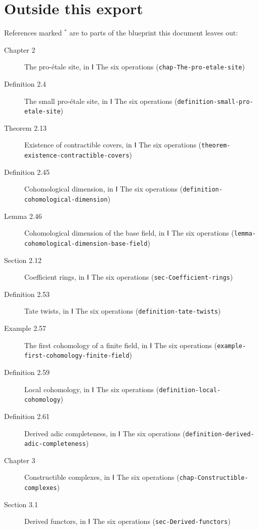 \documentclass[11pt]{article}
\newcommand{\bpslug}[1]{\texttt{#1}}
\begin{document}
\section*{Outside this export}
References marked \ensuremath{{}^\ast} are to parts of the blueprint this document leaves out:
\begin{description}
\item[Chapter 2] The pro-étale site, in Ⅰ The six operations (\bpslug{chap-{}\allowbreak{}The-{}\allowbreak{}pro-{}\allowbreak{}etale-{}\allowbreak{}site})
\item[Definition 2.4] The small pro-étale site, in Ⅰ The six operations (\bpslug{definition-{}\allowbreak{}small-{}\allowbreak{}pro-{}\allowbreak{}etale-{}\allowbreak{}site})
\item[Theorem 2.13] Existence of contractible covers, in Ⅰ The six operations (\bpslug{theorem-{}\allowbreak{}existence-{}\allowbreak{}contractible-{}\allowbreak{}covers})
\item[Definition 2.45] Cohomological dimension, in Ⅰ The six operations (\bpslug{definition-{}\allowbreak{}cohomological-{}\allowbreak{}dimension})
\item[Lemma 2.46] Cohomological dimension of the base field, in Ⅰ The six operations (\bpslug{lemma-{}\allowbreak{}cohomological-{}\allowbreak{}dimension-{}\allowbreak{}base-{}\allowbreak{}field})
\item[Section 2.12] Coefficient rings, in Ⅰ The six operations (\bpslug{sec-{}\allowbreak{}Coefficient-{}\allowbreak{}rings})
\item[Definition 2.53] Tate twists, in Ⅰ The six operations (\bpslug{definition-{}\allowbreak{}tate-{}\allowbreak{}twists})
\item[Example 2.57] The first cohomology of a finite field, in Ⅰ The six operations (\bpslug{example-{}\allowbreak{}first-{}\allowbreak{}cohomology-{}\allowbreak{}finite-{}\allowbreak{}field})
\item[Definition 2.59] Local cohomology, in Ⅰ The six operations (\bpslug{definition-{}\allowbreak{}local-{}\allowbreak{}cohomology})
\item[Definition 2.61] Derived adic completeness, in Ⅰ The six operations (\bpslug{definition-{}\allowbreak{}derived-{}\allowbreak{}adic-{}\allowbreak{}completeness})
\item[Chapter 3] Constructible complexes, in Ⅰ The six operations (\bpslug{chap-{}\allowbreak{}Constructible-{}\allowbreak{}complexes})
\item[Section 3.1] Derived functors, in Ⅰ The six operations (\bpslug{sec-{}\allowbreak{}Derived-{}\allowbreak{}functors})

\end{description}
\end{document}
